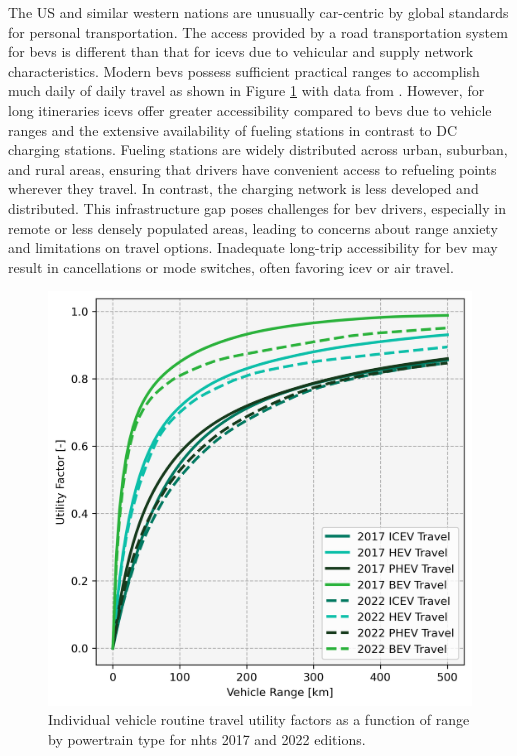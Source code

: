 \documentclass[11pt]{article}
\begin{document}
\begin{multicols}{2}
The US and similar western nations are unusually car-centric by global standards \cite{PrietoCuriel_2024} for personal transportation. The access provided by a road transportation system for \glspl{bev} is different than that for \glspl{icev} due to vehicular and supply network characteristics. Modern \glspl{bev} possess sufficient practical ranges to accomplish much daily of daily travel as shown in Figure \ref{fig:utility_factors} with data from \cite{NHTS_2017, NHTS_2022}. However, for long itineraries \glspl{icev} offer greater accessibility compared to \glspl{bev} due to vehicle ranges and the extensive availability of fueling stations in contrast to DC charging stations. Fueling stations are widely distributed across urban, suburban, and rural areas, ensuring that drivers have convenient access to refueling points wherever they travel. In contrast, the  charging network is less developed and distributed. This infrastructure gap poses challenges for \gls{bev} drivers, especially in remote or less densely populated areas, leading to concerns about range anxiety and limitations on travel options. Inadequate long-trip accessibility for \gls{bev} may result in cancellations or mode switches, often favoring \gls{icev} or air travel.

\begin{figure}[H]
	\centering
	\includegraphics[width = \linewidth]{figs/UF_2017_2022_km.png}
	\caption{Individual vehicle routine travel utility factors as a function of range by powertrain type for \gls{nhts} 2017 and 2022 editions.}
	\label{fig:utility_factors}
\end{figure}


\end{multicols}
\end{document}
